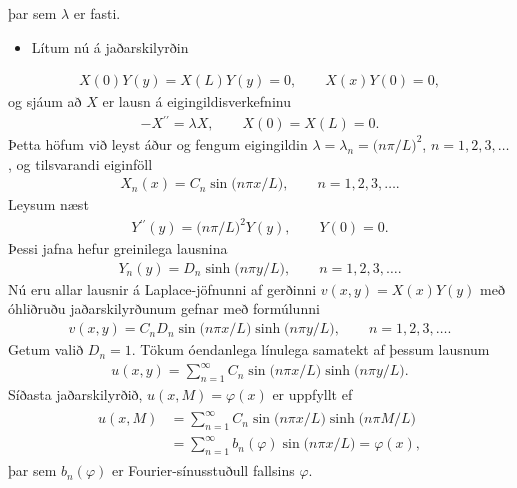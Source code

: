 \documentclass[a4paper,10pt,icelandic]{sphinxmanual}
\begin{document}
þar sem \(\lambda\) er fasti.
\begin{itemize}
\item {} 
Lítum nú á jaðarskilyrðin

\end{itemize}
\begin{equation*}
\begin{split}X(0)Y(y)=X(L)Y(y)=0, \qquad X(x)Y(0)=0,\end{split}
\end{equation*}
og sjáum að \(X\) er lausn á eigingildisverkefninu
\begin{equation*}
\begin{split}-X{{^{\prime\prime}}}=\lambda X, \qquad X(0)=X(L)=0.\end{split}
\end{equation*}
Þetta höfum við leyst áður og fengum eigingildin
\(\lambda=\lambda_n=\big(n\pi/L\big)^2\), \(n=1,2,3,\dots\), og
tilsvarandi eiginföll
\begin{equation*}
\begin{split}X_n(x)=C_n \sin\big(n\pi x/L\big), \qquad n=1,2,3,\dots.\end{split}
\end{equation*}
Leysum næst
\begin{equation*}
\begin{split}Y{{^{\prime\prime}}}(y)=\big(n\pi/L\big)^2 Y(y), \qquad Y(0)=0.\end{split}
\end{equation*}
Þessi jafna hefur greinilega lausnina
\begin{equation*}
\begin{split}Y_n(y)=D_n \sinh\big(n\pi y/L\big), \qquad n=1,2,3,\dots.\end{split}
\end{equation*}
Nú eru allar lausnir á Laplace-jöfnunni af gerðinni
\(v(x,y)=X(x)Y(y)\) með óhliðruðu jaðarskilyrðunum gefnar með formúlunni
\begin{equation*}
\begin{split}v(x,y)=C_nD_n \sin\big(n\pi x/L\big)\sinh\big(n\pi y/L\big), \qquad
 n=1,2,3,\dots.\end{split}
\end{equation*}
Getum valið \(D_n=1\). Tökum óendanlega línulega samatekt af þessum lausnum
\begin{equation*}
\begin{split}u(x,y)=\sum\limits_{n=1}^\infty
 C_n\sin\big(n\pi x/L\big)\sinh\big(n\pi y/L\big).\end{split}
\end{equation*}
Síðasta jaðarskilyrðið,
\(u(x,M)=\varphi(x)\) er uppfyllt ef
\begin{equation*}
\begin{split}\begin{aligned}
 u(x,M)&= \sum\limits_{n=1}^\infty
 C_n \sin\big(n\pi x/L\big)\sinh\big(n\pi M/L\big)\\
 &= \sum\limits_{n=1}^\infty
 b_n(\varphi) \sin\big(n\pi x/L\big)=\varphi(x),\end{aligned}\end{split}
\end{equation*}
þar sem \(b_n(\varphi)\) er Fourier-sínusstuðull fallsins
\(\varphi\).
\end{document}

